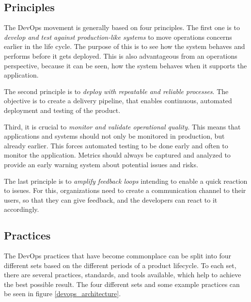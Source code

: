 \documentclass[12pt,english,a4paper,oneside,,tablecaptionabove]{scrbook}
\begin{document}
\hypertarget{principles}{%
\subsection{Principles}\label{principles}}

The DevOps movement is generally based on four principles. The first one
is to \emph{develop and test against production-like systems} to move
operations concerns earlier in the life cycle. The purpose of this is to
see how the system behaves and performs before it gets deployed. This is
also advantageous from an operations perspective, because it can be
seen, how the system behaves when it supports the application.

The second principle is to \emph{deploy with repeatable and reliable
processes}. The objective is to create a delivery pipeline, that enables
continuous, automated deployment and testing of the product.

Third, it is crucial to \emph{monitor and validate operational quality.}
This means that applications and systems should not only be monitored in
production, but already earlier. This forces automated testing to be
done early and often to monitor the application. Metrics should always
be captured and analyzed to provide an early warning system about
potential issues and risks.

The last principle is to \emph{amplify feedback loops} intending to
enable a quick reaction to issues. For this, organizations need to
create a communication channel to their users, so that they can give
feedback, and the developers can react to it accordingly.

\hypertarget{practices}{%
\subsection{Practices}\label{practices}}

The DevOps practices that have become commonplace can be split into four
different sets based on the different periods of a product lifecycle. To
each set, there are several practices, standards, and tools available,
which help to achieve the best possible result. The four different sets
and some example practices can be seen in figure
\ref{devops_architecture}.
\end{document}

